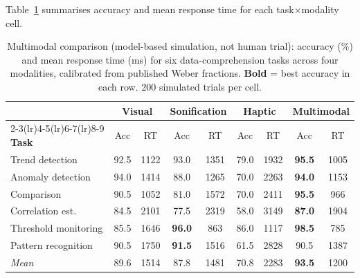 \documentclass[sigchi, nonacm]{acmart}
\begin{document}
Table~\ref{tab:multimodal} summarises accuracy and mean response time for each
task$\times$modality cell.

\begin{table}[t]
\centering
\caption{Multimodal comparison (model-based simulation, not human trial): accuracy (\%) and mean response time (ms) for six data-comprehension tasks across four modalities, calibrated from published Weber fractions. \textbf{Bold} = best accuracy in each row. 200 simulated trials per cell.}
\label{tab:multimodal}
\small
\begin{tabular}{l cc cc cc cc}
\toprule
 & \multicolumn{2}{c}{\textbf{Visual}} & \multicolumn{2}{c}{\textbf{Sonification}} & \multicolumn{2}{c}{\textbf{Haptic}} & \multicolumn{2}{c}{\textbf{Multimodal}} \\
\cmidrule(lr){2-3}\cmidrule(lr){4-5}\cmidrule(lr){6-7}\cmidrule(lr){8-9}
\textbf{Task} & Acc & RT & Acc & RT & Acc & RT & Acc & RT \\
\midrule
Trend detection       & 92.5 & 1122 & 93.0 & 1351 & 79.0 & 1932 & \textbf{95.5} & 1005 \\
Anomaly detection     & 94.0 & 1414 & 88.0 & 1265 & 70.0 & 2263 & \textbf{94.0} & 1153 \\
Comparison            & 90.5 & 1052 & 81.0 & 1572 & 70.0 & 2411 & \textbf{95.5} &  966 \\
Correlation est.      & 84.5 & 2101 & 77.5 & 2319 & 58.0 & 3149 & \textbf{87.0} & 1904 \\
Threshold monitoring  & 85.5 & 1646 & \textbf{96.0} &  863 & 86.0 & 1117 & \textbf{98.5} &  785 \\
Pattern recognition   & 90.5 & 1750 & \textbf{91.5} & 1516 & 61.5 & 2828 & 90.5 & 1387 \\
\midrule
\textit{Mean}         & 89.6 & 1514 & 87.8 & 1481 & 70.8 & 2283 & \textbf{93.5} & 1200 \\
\bottomrule
\end{tabular}
\end{table}
\end{document}
